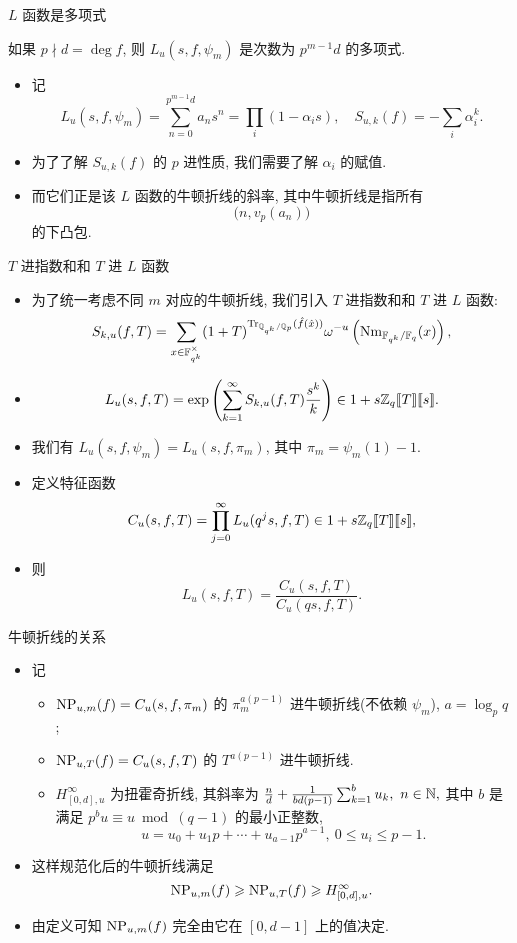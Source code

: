 \documentclass[aspectratio=169,handout]{ctexbeamer}
\newcommand\ldb{\llbracket}
\newcommand\rdb{\rrbracket}
\begin{document}
\begin{frame}{$L$ 函数是多项式}
	\onslide<+->
	\begin{theorem}
		如果 $p\nmid d=\deg f$, 则 $L_u(s,f,\psi_m)$ 是次数为 $p^{m-1}d$ 的多项式.
	\end{theorem}
	\begin{itemize}
		\item 记
		\[
			L_u(s,f,\psi_m)=\sum_{n=0}^{p^{m-1}d} a_n s^n=\prod_i(1-\alpha_i s),
			\quad S_{u,k}(f)=-\sum_i \alpha_i^k.
		\]
		\item 为了了解 $S_{u,k}(f)$ 的 $p$ 进性质, 我们需要了解 $\alpha_i$ 的赋值.
		\item 而它们正是该 $L$ 函数的牛顿折线的斜率, 其中牛顿折线是指所有
		\[
			\bigl(n,v_p(a_n)\bigr)
		\]
		的下凸包.
	\end{itemize}
\end{frame}


\begin{frame}{$T$ 进指数和和 $T$ 进 $L$ 函数}
	\begin{itemize}
		\item 为了统一考虑不同 $m$ 对应的牛顿折线, 我们引入 $T$ 进指数和和 $T$ 进 $L$ 函数:
		\[
			S_{k,u}(f,T)=\sum_{x\in{\mathbb{F}}_{q^k}^\times}(1+T)^{{\mathrm{Tr}}_{{\mathbb{Q}}_{q^k}/{\mathbb{Q}}_p}(\hat f(\hat x))}\omega^{-u}\left({\mathrm{Nm}}_{{\mathbb{F}}_{q^k}/{\mathbb{F}}_q}(x)\right), 
		\]
		\item 
		\[
			L_u(s,f,T)=\exp\left(\sum_{k=1}^\infty S_{k,u}(f,T)\frac{s^k}{k}\right)\in 1+s\BZ_q\ldb T\rdb\ldb s\rdb.
		\]
		\item 我们有 $L_u(s,f,\psi_m)=L_u(s,f,\pi_m)$, 其中 $\pi_m=\psi_m(1)-1$.
		\item 定义特征函数
		\[
			C_u(s,f,T)=\prod_{j=0}^\infty L_u(q^j s,f,T)\in 1+s\BZ_q\ldb T\rdb\ldb s\rdb,
		\]
		\item 则
		\[
			L_u(s,f,T)=\frac{C_u(s,f,T)}{C_u(qs,f,T)}.
		\]
	\end{itemize}
\end{frame}


\begin{frame}{牛顿折线的关系}
	\begin{itemize}
		\item 记
		\begin{itemize}
			\item ${\mathrm{NP}}_{u,m}(f)=C_u(s,f,\pi_m)$ 的 $\pi_m^{a(p-1)}$ 进牛顿折线(不依赖 $\psi_m$), $a=\log_p q$;
			\item ${\mathrm{NP}}_{u,T}(f)=C_u(s,f,T)$ 的 $T^{a(p-1)}$ 进牛顿折线.
			\item $H_{[0,d],u}^\infty$ 为扭霍奇折线, 其斜率为 $\tfrac{n}{d}+\tfrac{1}{bd(p-1)}\sum_{k=1}^b u_k,\ n\in\BN,$
			其中 $b$ 是满足 $p^bu\equiv u\bmod{(q-1)}$ 的最小正整数,
			\[
				u=u_0+u_1p+\cdots+u_{a-1}p^{a-1},\ 0\le u_i\le p-1.
			\]
		\end{itemize}
		\item 这样规范化后的牛顿折线满足
		\[
			{\mathrm{NP}}_{u,m}(f)\geqslant {\mathrm{NP}}_{u,T}(f)\geqslant H_{[0,d],u}^\infty.
		\]
		\item 由定义可知 ${\mathrm{NP}}_{u,m}(f)$ 完全由它在 $[0,d-1]$ 上的值决定.
	\end{itemize}
\end{frame}
\end{document}
